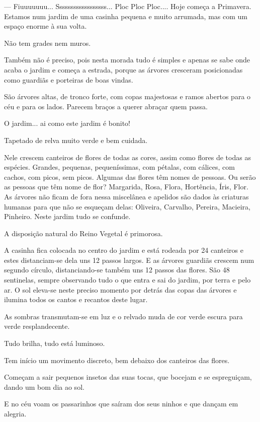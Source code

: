 
— Fiuuuuuuu... Ssssssssssssssssss... Ploc Ploc Ploc....
\bigbreak
Hoje começa a Primavera.
\bigbreak
Estamos num jardim de uma casinha pequena e muito arrumada, mas com um espaço enorme à sua volta.

Não tem grades nem muros.

Também não é preciso, pois nesta morada tudo é simples e apenas se sabe onde acaba o jardim e começa a estrada, porque as árvores cresceram posicionadas como guardiãs e porteiras de boas vindas.

São árvores altas, de tronco forte, com copas majestosas e ramos abertos para o céu e para os lados. Parecem braços a querer abraçar quem passa.

O jardim... ai como este jardim é bonito!

Tapetado de relva muito verde e bem cuidada.

Nele crescem canteiros de flores de todas as cores, assim como flores de todas as espécies. Grandes, pequenas, pequeníssimas, com pétalas, com cálices, com cachos, com picos, sem picos.
Algumas das flores têm nomes de pessoas. Ou serão as pessoas que têm nome de flor? Margarida, Rosa, Flora, Hortência, Íris, Flor.
As árvores não ficam de fora nessa miscelânea e apelidos são dados às criaturas humanas para que não se esqueçam delas: Oliveira, Carvalho, Pereira, Macieira, Pinheiro. Neste jardim tudo se confunde.

A disposição natural do Reino Vegetal é primorosa.

A casinha fica colocada no centro do jardim e está rodeada por 24 canteiros e estes distanciam-se dela uns 12 passos largos. E as árvores guardiãs crescem num segundo círculo, distanciando-se também uns 12 passos das flores. São 48 sentinelas, sempre observando tudo o que entra e sai do jardim, por terra e pelo ar.
\bigbreak
O sol eleva-se neste preciso momento por detrás das copas das árvores e ilumina todos os cantos e recantos deste lugar.

As sombras transmutam-se em luz e o relvado muda de cor verde escura para verde resplandecente.

Tudo brilha, tudo está luminoso.

Tem início um movimento discreto, bem debaixo dos canteiros das flores.

Começam a sair pequenos insetos das suas tocas, que bocejam e se espreguiçam, dando um bom dia ao sol.

E no céu voam os passarinhos que saíram dos seus ninhos e que dançam em alegria.

